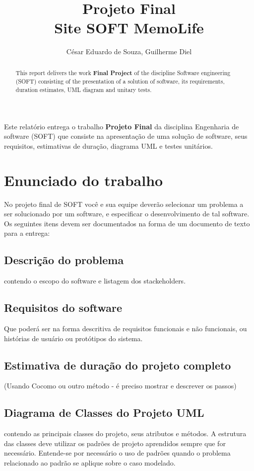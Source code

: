 \documentclass[12pt]{article}
\title{Projeto Final\\ Site SOFT MemoLife}
\author{César Eduardo de Souza, Guilherme Diel}
\begin{document}
 

\maketitle

\begin{abstract}
  This report delivers the work \textbf{Final Project} of the discipline
  Software engineering (SOFT) consisting of the presentation of a solution
  of software, its requirements, duration estimates, UML diagram and
  unitary tests.
\end{abstract}
     
\begin{resumo} 
  Este relatório entrega o trabalho \textbf{Projeto Final} da disciplina 
  Engenharia de software (SOFT) que consiste na apresentação de uma solução
  de software, seus requisitos, estimativas de duração, diagrama UML e
  testes unitários.
\end{resumo}


\section{Enunciado do trabalho} %
No projeto final de SOFT você e sua equipe deverão selecionar um problema a ser solucionado por um software, e especificar o desenvolvimento de tal software. Os seguintes itens devem ser documentados na forma de um documento de texto para a entrega:
\subsection{Descrição do problema}
contendo o escopo do software e listagem dos stackeholders.
\subsection{Requisitos do software}
Que poderá ser na forma descritiva de requisitos funcionais e não funcionais, ou histórias de usuário ou protótipos do sistema.
\subsection{Estimativa de duração do projeto completo}
(Usando Cocomo ou outro método - é preciso mostrar e descrever os passos)
\subsection{Diagrama de Classes do Projeto UML}
contendo as principais classes do projeto, seus atributos e métodos. A estrutura das classes deve utilizar os padrões de projeto aprendidos sempre que for necessário. Entende-se por necessário o uso de padrões quando o problema relacionado ao padrão se aplique sobre o caso modelado.
\end{document}
